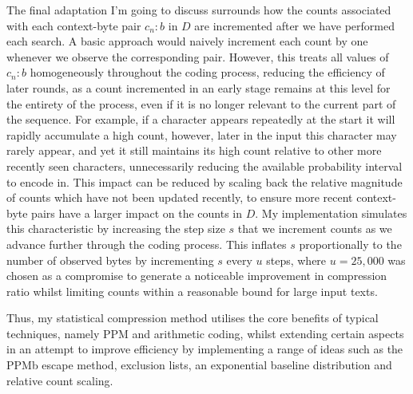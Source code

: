 \documentclass[a4paper, 11pt]{article}
\begin{document}
The final adaptation I'm going to discuss surrounds how the counts associated with each context-byte pair $c_{n} \colon b$ in $D$ are incremented after we have performed each search. A basic approach would naively increment each count by one whenever we observe the corresponding pair. However, this treats all values of $c_{n} \colon b$ homogeneously throughout the coding process, reducing the efficiency of later rounds, as a count incremented in an early stage remains at this level for the entirety of the process, even if it is no longer relevant to the current part of the sequence. For example, if a character appears repeatedly at the start it will rapidly accumulate a high count, however, later in the input this character may rarely appear, and yet it still maintains its high count relative to other more recently seen characters, unnecessarily reducing the available probability interval to encode in. This impact can be reduced by scaling back the relative magnitude of counts which have not been updated recently, to ensure more recent context-byte pairs have a larger impact on the counts in $D$. My implementation simulates this characteristic by increasing the step size $s$ that we increment counts as we advance further through the coding process. This inflates $s$ proportionally to the number of observed bytes by incrementing $s$ every $u$ steps, where $u=25,000$ was chosen as a compromise to generate a noticeable improvement in compression ratio whilst limiting counts within a reasonable bound for large input texts.

Thus, my statistical compression method utilises the core benefits of typical techniques, namely PPM and arithmetic coding, whilst extending certain aspects in an attempt to improve efficiency by implementing a range of ideas such as the PPMb escape method, exclusion lists, an exponential baseline distribution and relative count scaling.

\nocite{*}


\end{document}
